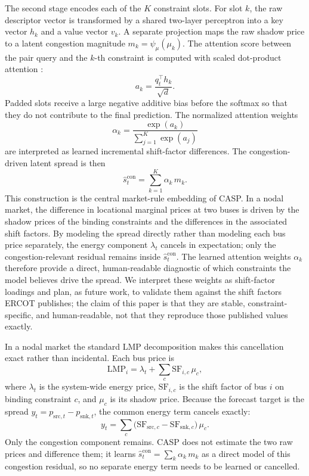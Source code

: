 \documentclass{article}
\begin{document}
The second stage encodes each of the $K$ constraint slots. For slot $k$, the raw descriptor vector is transformed by a shared two-layer perceptron into a key vector $h_k$ and a value vector $v_k$. A separate projection maps the raw shadow price to a latent congestion magnitude $m_k = \psi_\mu(\mu_k)$. The attention score between the pair query and the $k$-th constraint is computed with scaled dot-product attention \cite{vaswani2017attention}:
\[
a_k = \frac{q_t^{\top} h_k}{\sqrt{d}}.
\]
Padded slots receive a large negative additive bias before the softmax so that they do not contribute to the final prediction. The normalized attention weights
\[
\alpha_k = \frac{\exp(a_k)}{\sum_{j=1}^{K} \exp(a_j)}
\]
are interpreted as learned incremental shift-factor differences. The congestion-driven latent spread is then
\[
\hat{s}_t^{\mathrm{con}} = \sum_{k=1}^{K} \alpha_k\, m_k.
\]
This construction is the central market-rule embedding of CASP. In a nodal market, the difference in locational marginal prices at two buses is driven by the shadow prices of the binding constraints and the differences in the associated shift factors. By modeling the spread directly rather than modeling each bus price separately, the energy component $\lambda_t$ cancels in expectation; only the congestion-relevant residual remains inside $\hat{s}_t^{\mathrm{con}}$. The learned attention weights $\alpha_k$ therefore provide a direct, human-readable diagnostic of which constraints the model believes drive the spread. We interpret these weights as shift-factor loadings and plan, as future work, to validate them against the shift factors ERCOT publishes; the claim of this paper is that they are stable, constraint-specific, and human-readable, not that they reproduce those published values exactly.

In a nodal market the standard LMP decomposition makes this cancellation exact rather than incidental. Each bus price is
\[
\mathrm{LMP}_i = \lambda_t + \sum_{c} \mathrm{SF}_{i,c}\, \mu_c,
\]
where $\lambda_t$ is the system-wide energy price, $\mathrm{SF}_{i,c}$ is the shift factor of bus $i$ on binding constraint $c$, and $\mu_c$ is its shadow price. Because the forecast target is the spread $y_t = p_{\mathrm{src},t} - p_{\mathrm{snk},t}$, the common energy term cancels exactly:
\[
y_t = \sum_c \bigl(\mathrm{SF}_{\mathrm{src},c} - \mathrm{SF}_{\mathrm{snk},c}\bigr)\, \mu_c.
\]
Only the congestion component remains. CASP does not estimate the two raw prices and difference them; it learns $\hat{s}_t^{\mathrm{con}} = \sum_k \alpha_k\, m_k$ as a direct model of this congestion residual, so no separate energy term needs to be learned or cancelled.
\end{document}
